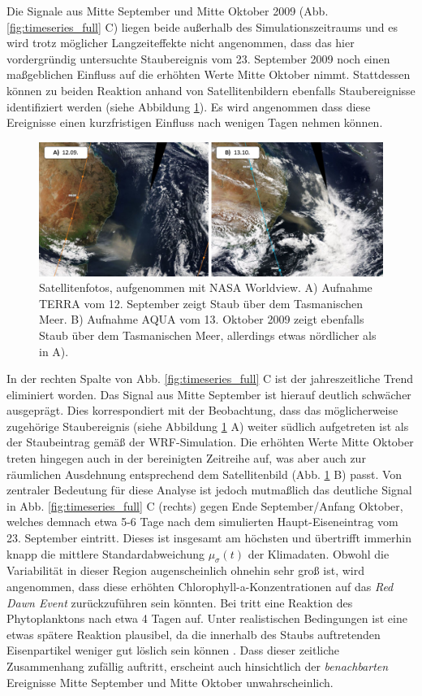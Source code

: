 \documentclass[12pt,a4paper,onecolumn,headheight=30pt]{scrartcl}
\begin{document}
Die Signale aus Mitte September und Mitte Oktober 2009 (Abb. \ref{fig:timeseries_full} C) liegen beide außerhalb des Simulationszeitraums und es wird trotz möglicher Langzeiteffekte \citep{Boyd.2010} nicht angenommen, dass das hier vordergründig untersuchte Staubereignis vom 23. September 2009 noch einen maßgeblichen Einfluss auf die erhöhten Werte Mitte Oktober nimmt. Stattdessen können zu beiden Reaktion anhand von Satellitenbildern ebenfalls Staubereignisse identifiziert werden (siehe Abbildung \ref{fig:duststorms_surrounding}). Es wird angenommen dass diese Ereignisse einen kurzfristigen Einfluss nach wenigen Tagen nehmen können. 
\begin{figure}[htbp]
\includegraphics[width=\textwidth]{bilder/duststorms_surround.png}
\caption{Satellitenfotos, aufgenommen mit NASA Worldview. A) Aufnahme TERRA vom 12. September zeigt Staub über dem Tasmanischen Meer. B) Aufnahme AQUA vom 13. Oktober 2009 zeigt ebenfalls Staub über dem Tasmanischen Meer, allerdings etwas nördlicher als in A). } \label{fig:duststorms_surrounding}
\end{figure}
In der rechten Spalte von Abb. \ref{fig:timeseries_full} C ist der jahreszeitliche Trend eliminiert worden. Das Signal aus Mitte September ist hierauf deutlich schwächer ausgeprägt. Dies korrespondiert mit der Beobachtung, dass das möglicherweise zugehörige Staubereignis (siehe Abbildung \ref{fig:duststorms_surrounding} A) weiter südlich aufgetreten ist als der Staubeintrag gemäß der WRF-Simulation. Die erhöhten Werte Mitte Oktober treten hingegen auch in der bereinigten Zeitreihe auf, was aber auch zur räumlichen Ausdehnung entsprechend dem Satellitenbild (Abb. \ref{fig:duststorms_surrounding} B) passt. Von zentraler Bedeutung für diese Analyse ist jedoch mutmaßlich das deutliche Signal in Abb. \ref{fig:timeseries_full} C (rechts) gegen Ende September/Anfang Oktober, welches demnach etwa 5-6 Tage nach dem simulierten Haupt-Eiseneintrag vom 23. September eintritt. Dieses ist insgesamt am höchsten und übertrifft immerhin knapp die mittlere Standardabweichung $\mu_\sigma(t)$ der Klimadaten. Obwohl die Variabilität in dieser Region augenscheinlich ohnehin sehr groß ist, wird angenommen, dass diese erhöhten Chlorophyll-a-Konzentrationen auf das \textit{Red Dawn Event} zurückzuführen sein könnten. Bei \citet{Martin.1988} tritt eine Reaktion des Phytoplanktons nach etwa 4 Tagen auf. Unter realistischen Bedingungen ist eine etwas spätere Reaktion plausibel, da die innerhalb des Staubs auftretenden Eisenpartikel weniger gut löslich sein können \citep{Shao.2011}. Dass dieser zeitliche Zusammenhang zufällig auftritt, erscheint auch hinsichtlich der \textit{benachbarten} Ereignisse Mitte September und Mitte Oktober unwahrscheinlich. \\
\end{document}
